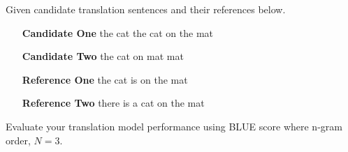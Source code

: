 Given candidate translation sentences and their references below. 

\begin{itemize}
	\item	[\textbf{Candidate One}] the cat the cat on the mat
	\item	[\textbf{Candidate Two}] the cat on mat mat
	\item	[\textbf{Reference One}] the cat is on the mat
	\item	[\textbf{Reference Two}] there is a cat on the mat
\end{itemize}

Evaluate your translation model performance using BLUE score where n-gram order, $N=3$.

